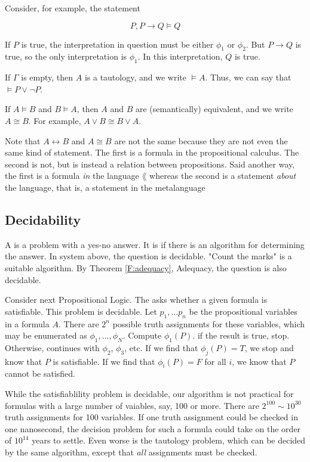 Consider, for example, the statement

$$
P, P \to Q \models Q
$$

If $P$ is true, the interpretation in question must be either $\phi_1$ or
$\phi_2$. But $P \to Q$ is true, so the only interpretation is $\phi_1$.  In this interpretation, $Q$ is true. 


If $\Gamma$ is empty, then $A$ is a tautology, and we write $\models A$.   Thus, we can say that $\models P \lor \neg P$.


If $A \models B$ and $B \models A$, then $A$ and $B$  are (semantically) equivalent, and we write $A \cong B$.  For example, $A \lor B \cong B \lor A$.

Note that $A \leftrightarrow B$ and $A \cong B$ are not the same because they are not even the same kind of statement.  The first is a formula in the propositional calculus.  The second is not, but is instead a relation between propositions.  Said another way, the first is a formula \emph{in} the language $\lang$ whereas the second is a statement \emph{about} the language, that is, a statement in the metalanguage


\subsection{Decidability}



A  is a problem with a yes-no answer.  It is  if there is an algorithm for determining the answer.  In system  above, the question  is decidable.  "Count the marks" is  a suitable algorithm.  By Theorem \ref{F:adequacy}, Adequacy, the question  is also decidable.


Consider next Propositional Logic.  The  asks whether a given formula is satisfiable.  This problem is decidable.  Let $p_1, \ldots p_n$ be the propositional variables in a formula $A$.  There are $2^n$ possible truth assignments for these variables, which may be enumerated as $\phi_1, \ldots, \phi_N$.  Compute $\phi_1(P)$.  if the result is true, stop.  Otherwise, continues with $\phi_2$, $\phi_3$, etc. If we find that $\phi_j(P) = T$, we stop and know that $P$ is satisfiable.  If we find that $\phi_i(P) = F$ for all $i$, we know that $P$ cannot be satisfied.

While the satisfiablility problem is decidable, our algorithm is not practical for formulas with a large number of vaiables, say, 100 or more.  There are
$2^{100} \sim 10^{30}$ truth assignments for 100 variables.  If one truth assignment could be checked in one nanosecond, the decision problem for such a formula could take on the order of $10^{14}$  years to settle.  Even worse is the tautology problem, which can be decided by the same algorithm, except that \emph{all} assignments must be checked.

